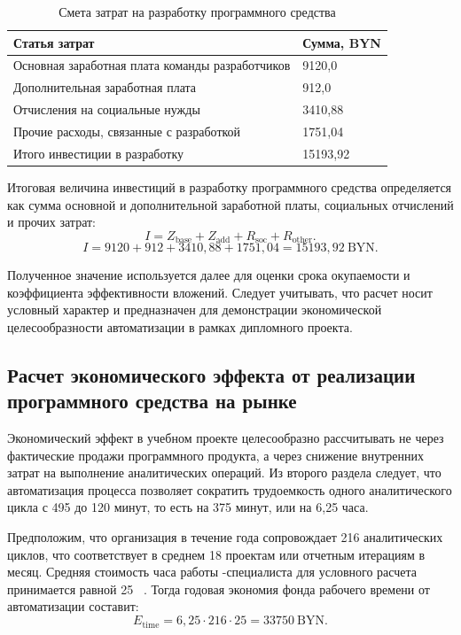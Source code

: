 \begin{table}[H]
    \caption{Смета затрат на разработку программного средства}
    \label{tab:development-cost-estimate}
    {\small
    \setlength{\tabcolsep}{4pt}
    \begin{tabularx}{\textwidth}{|P{0.55\textwidth}|Y|}
        \hline
        Статья затрат & Сумма, BYN \\
        \hline
        Основная заработная плата команды разработчиков & 9120{,}0 \\
        \hline
        Дополнительная заработная плата & 912{,}0 \\
        \hline
        Отчисления на социальные нужды & 3410{,}88 \\
        \hline
        Прочие расходы, связанные с разработкой & 1751{,}04 \\
        \hline
        Итого инвестиции в разработку & 15193{,}92 \\
        \hline
    \end{tabularx}
    }
\end{table}

Итоговая величина инвестиций в разработку программного средства определяется как сумма основной и дополнительной заработной платы, социальных отчислений и прочих затрат:
\[
I = Z_{\text{base}} + Z_{\text{add}} + R_{\text{soc}} + R_{\text{other}}.
\]
\[
I = 9120 + 912 + 3410{,}88 + 1751{,}04 = 15193{,}92 \ \text{BYN}.
\]

Полученное значение используется далее для оценки срока окупаемости и коэффициента эффективности вложений. Следует учитывать, что расчет носит условный характер и предназначен для демонстрации экономической целесообразности автоматизации в рамках дипломного проекта.

\subsection{Расчет экономического эффекта от реализации программного средства на рынке}

Экономический эффект в учебном проекте целесообразно рассчитывать не через фактические продажи программного продукта, а через снижение внутренних затрат на выполнение аналитических операций. Из второго раздела следует, что автоматизация процесса позволяет сократить трудоемкость одного аналитического цикла с 495 до 120 минут, то есть на 375 минут, или на 6{,}25 часа.

Предположим, что организация в течение года сопровождает 216 аналитических циклов, что соответствует в среднем 18 проектам или отчетным итерациям в месяц. Средняя стоимость часа работы -специалиста для условного расчета принимается равной 25 \ . Тогда годовая экономия фонда рабочего времени от автоматизации составит:
\[
E_{\text{time}} = 6{,}25 \cdot 216 \cdot 25 = 33750 \ \text{BYN}.
\]


